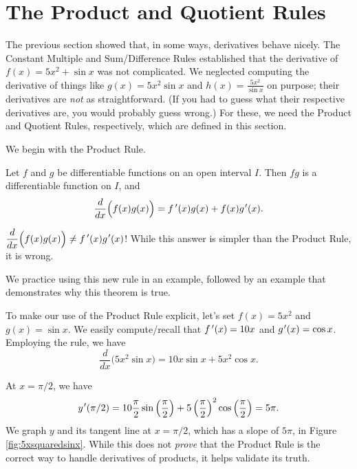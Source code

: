 \section{The Product and Quotient Rules}\label{sec:prod_quot_rules}

The previous section showed that, in some ways, derivatives behave nicely. The Constant Multiple and Sum/Difference Rules established that the derivative of $f(x) = 5x^2+\sin x $ was not complicated. We neglected computing the derivative of things like $g(x) = 5x^2\sin x$ and $h(x) = \frac{5x^2}{\sin x}$ on purpose; their derivatives are \textit{not} as straightforward. (If you had to guess what their respective derivatives are, you would probably guess wrong.) For these, we need the Product and Quotient Rules, respectively, which are defined in this section. 

We begin with the Product Rule.

{Let $f$ and $g$ be differentiable functions on an open interval $I$. Then $fg$ is a differentiable function on $I$, and $$\frac{d}{dx}\Big(f(x)g(x)\Big) =f\,'(x)g(x) + f(x)g\hskip.75pt'(x).$$}

 $\displaystyle\frac{d}{dx}\Big(f(x)g(x)\Big) \neq f\,'(x)g\hskip.75pt'(x)$! While this answer is simpler than the Product Rule, it is wrong. 

We practice using this new rule in an example, followed by an example that demonstrates why this theorem is true.\\

{To make our use of the Product Rule explicit, let's set $f(x) = 5x^2$ and $g(x) = \sin x$. We easily compute/recall that $f\,'(x) = 10x$ and $g\hskip.75pt'(x) = \cos x$. Employing the rule, we have $$\frac{d}{dx}\Big(5x^2\sin x\Big) = 10x\sin x + 5x^2\cos x.$$

At $x=\pi/2$, we have $$y\hskip.75pt'(\pi/2) = 10\frac{\pi}2 \sin\left(\frac{\pi}{2}\right) + 5\left(\frac{\pi}{2}\right)^2\cos \left(\frac{\pi}2\right) = 5\pi.$$ We graph $y$ and its tangent line at $x=\pi/2$, which has a slope of $5\pi$, in Figure \ref{fig:5xsquaredsinx}. While this does not \textit{prove} that the Product Rule is the correct way to handle derivatives of products, it helps validate its truth.
}\\

